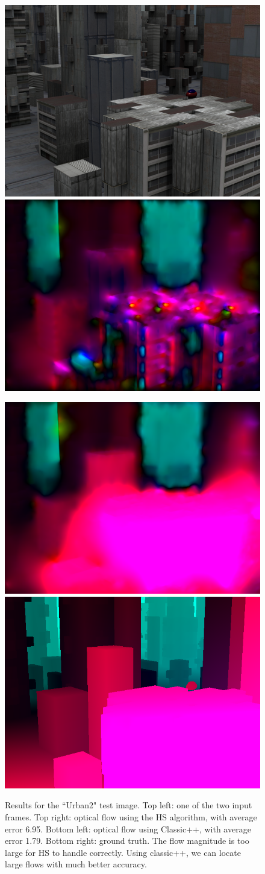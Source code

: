\documentclass[10pt,twocolumn,letterpaper]{article}
\begin{document}
\begin{figure}
\includegraphics[width=0.48 \columnwidth] {urban2_input.png} 
\includegraphics[width=0.48 \columnwidth] {urban2.png}

\includegraphics[width=0.48 \columnwidth] {urban2_multires.png} 
\includegraphics[width=0.48 \columnwidth] {urban2_truth.png} 

\caption{Results for the ``Urban2" test image.  Top left: one of the two input frames.  Top right: optical flow using the HS algorithm, with average error 6.95.  Bottom left: optical flow using Classic++, with average error 1.79.  Bottom right: ground truth.  The flow magnitude is too large for HS to handle correctly.  Using classic++, we can locate large flows with much better accuracy.}
\label{fig:urban2}
\end{figure}
\end{document}
